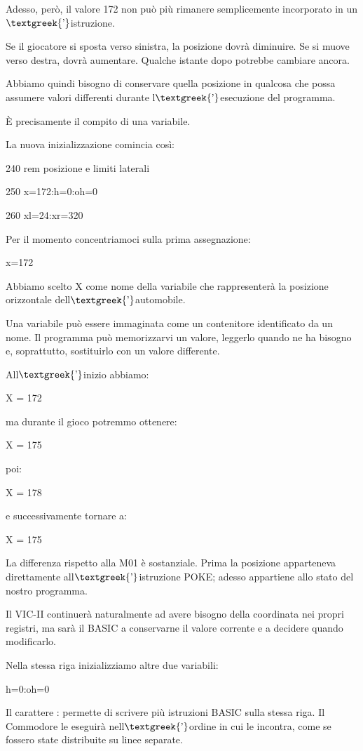 \documentclass{article}
\begin{document}
Adesso, però, il valore 172 non può più rimanere semplicemente incorporato in un$\text{\textgreek{’}}$istruzione.

Se il giocatore si sposta verso sinistra, la posizione dovrà diminuire. Se si muove verso destra, dovrà aumentare.
Qualche istante dopo potrebbe cambiare ancora.

Abbiamo quindi bisogno di conservare quella posizione in qualcosa che possa assumere valori differenti durante
l$\text{\textgreek{’}}$esecuzione del programma.

È precisamente il compito di una variabile.

La nuova inizializzazione comincia così:

240 rem posizione e limiti laterali

250 x=172:h=0:oh=0

260 xl=24:xr=320

Per il momento concentriamoci sulla prima assegnazione:

x=172

Abbiamo scelto X come nome della variabile che rappresenterà la posizione orizzontale
dell$\text{\textgreek{’}}$automobile.

Una variabile può essere immaginata come un contenitore identificato da un nome. Il programma può memorizzarvi un
valore, leggerlo quando ne ha bisogno e, soprattutto, sostituirlo con un valore differente.

All$\text{\textgreek{’}}$inizio abbiamo:

X = 172

ma durante il gioco potremmo ottenere:

X = 175

poi:

X = 178

e successivamente tornare a:

X = 175

La differenza rispetto alla M01 è sostanziale. Prima la posizione apparteneva direttamente
all$\text{\textgreek{’}}$istruzione POKE; adesso appartiene allo stato del nostro programma.

Il VIC-II continuerà naturalmente ad avere bisogno della coordinata nei propri registri, ma sarà il BASIC a conservarne
il valore corrente e a decidere quando modificarlo.

Nella stessa riga inizializziamo altre due variabili:

h=0:oh=0

Il carattere : permette di scrivere più istruzioni BASIC sulla stessa riga. Il Commodore le eseguirà
nell$\text{\textgreek{’}}$ordine in cui le incontra, come se fossero state distribuite su linee separate.
\end{document}
